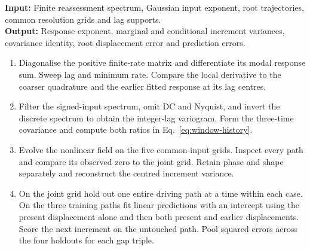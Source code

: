 \documentclass[11pt]{article}
\begin{document}
\begin{algorithm}[htbp]
\caption{Comparing response, variance and predictive memory on operational scales}
\small\textbf{Input:} Finite reassessment spectrum, Gaussian input exponent,
root trajectories, common resolution grids and lag supports.\\
\textbf{Output:} Response exponent, marginal and conditional increment
variances, covariance identity, root displacement error and prediction errors.
\begin{enumerate}\setlength{\itemsep}{.1em}
\item Diagonalise the positive finite-rate matrix and differentiate its
modal response sum. Sweep lag and minimum rate. Compare the local derivative
to the coarser quadrature and the earlier fitted response at its lag centres.
\item Filter the signed-input spectrum, omit DC and Nyquist, and invert
the discrete spectrum to obtain the integer-lag variogram. Form the
three-time covariance and compute both ratios in Eq.~\eqref{eq:window-history}.
\item Evolve the nonlinear field on the five common-input grids. Inspect
every path and compare its observed zero to the joint grid. Retain phase
and shape separately and reconstruct the centred increment variance.
\item On the joint grid hold out one entire driving path at a time within
each case. On the three training paths fit linear predictions with an
intercept using the present displacement alone and then both present
and earlier displacements. Score the next increment on the untouched
path. Pool squared errors across the four holdouts for each gap triple.
\end{enumerate}
\end{algorithm}
\end{document}
